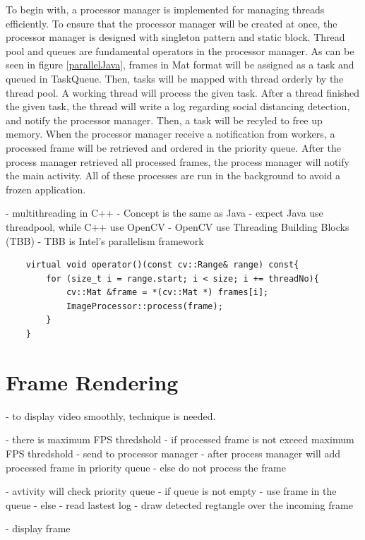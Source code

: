         To begin with, a processor manager is implemented for managing threads efficiently.
        To ensure that the processor manager will be created at once,
        the processor manager is designed with singleton pattern and static block.
        Thread pool and queues are fundamental operators in the processor manager.
        As can be seen in figure \ref{parallelJava}, frames in Mat format will be assigned as a task and queued in TaskQueue.
        Then, tasks will be mapped with thread orderly by the thread pool.
        A working thread will process the given task.
        After a thread finished the given task,
        the thread will write a log regarding social distancing detection, and notify the processor manager.
        Then, a task will be recyled to free up memory.
        When the processor manager receive a notification from workers,
        a processed frame will be retrieved and ordered in the priority queue.
        After the process manager retrieved all processed frames,
        the process manager will notify the main activity.
        All of these processes are run in the background to avoid a frozen application.

        - multithreading in C++
        - Concept is the same as Java
            - expect Java use threadpool, while C++ use OpenCV
        - OpenCV use Threading Building Blocks (TBB)
        - TBB is Intel's parallelism framework

\begin{lstlisting}
    virtual void operator()(const cv::Range& range) const{
        for (size_t i = range.start; i < size; i += threadNo){
            cv::Mat &frame = *(cv::Mat *) frames[i];
            ImageProcessor::process(frame);
        }
    }
\end{lstlisting}

    \section{Frame Rendering}
        - to display video smoothly, technique is needed.

        - there is maximum FPS thredshold
        - if processed frame is not exceed maximum FPS thredshold
            - send to processor manager
                - after process manager will add processed frame in priority queue
        - else do not process the frame

        - avtivity will check priority queue
            - if queue is not empty
                - use frame in the queue
            - else
                - read lastest log
                - draw detected regtangle over the incoming frame

        - display frame
